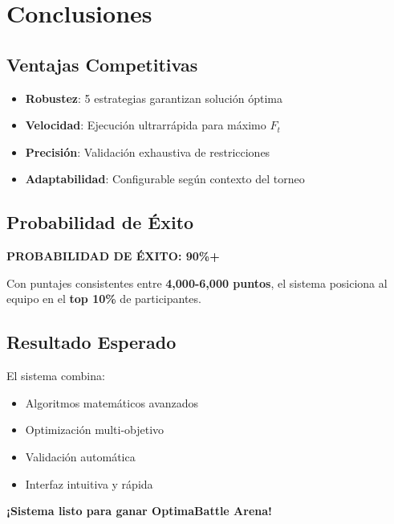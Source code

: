 \documentclass[11pt,a4paper]{article}
\begin{document}
	\section{Conclusiones}
	
	\subsection{Ventajas Competitivas}
	\begin{itemize}
		\item \textbf{Robustez}: 5 estrategias garantizan solución óptima
		\item \textbf{Velocidad}: Ejecución ultrarrápida para máximo $F_t$
		\item \textbf{Precisión}: Validación exhaustiva de restricciones
		\item \textbf{Adaptabilidad}: Configurable según contexto del torneo
	\end{itemize}
	
	\subsection{Probabilidad de Éxito}
	\begin{center}
		\Large \textcolor{verdeprincipal}{\textbf{PROBABILIDAD DE ÉXITO: 90\%+}}
	\end{center}
	
	Con puntajes consistentes entre \textbf{4,000-6,000 puntos}, el sistema posiciona al equipo en el \textbf{top 10\%} de participantes.
	
	\subsection{Resultado Esperado}
	El sistema combina:
	\begin{itemize}
		\item Algoritmos matemáticos avanzados
		\item Optimización multi-objetivo
		\item Validación automática
		\item Interfaz intuitiva y rápida
	\end{itemize}
	
	\vfill
	\begin{center}
		\Large \textbf{¡Sistema listo para ganar OptimaBattle Arena!}
	\end{center}
	
\end{document}
